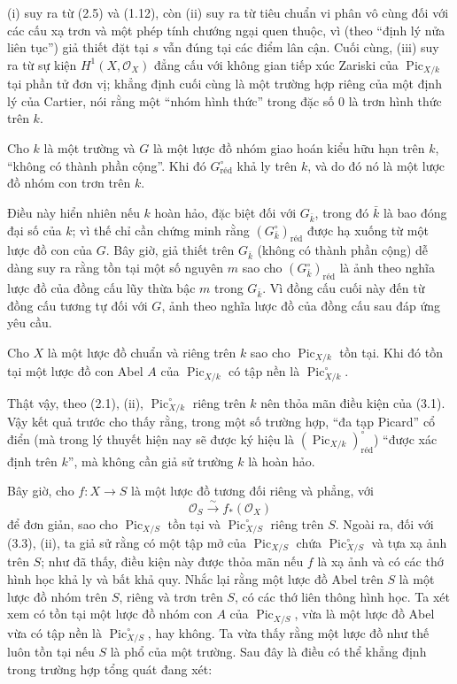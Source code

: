 (i) suy ra từ (2.5) và (1.12), còn (ii) suy ra từ tiêu chuẩn vi phân vô cùng
đối với các cấu xạ trơn và một phép tính chướng ngại quen thuộc, vì (theo
``định lý nửa liên tục'') giả thiết đặt tại $s$ vẫn đúng tại các điểm lân cận.
Cuối cùng, (iii) suy ra từ sự kiện $H^1(X,\mathcal O_X)$ đẳng cấu với không
gian tiếp xúc Zariski của $\operatorname{Pic}_{X/k}$ tại phần tử đơn vị; khẳng
định cuối cùng là một trường hợp riêng của một định lý của Cartier, nói rằng
một ``nhóm hình thức'' trong đặc số 0 là trơn hình thức trên $k$.


 Cho $k$ là một trường và $G$ là một lược đồ nhóm giao
hoán kiểu hữu hạn trên $k$, ``không có thành phần cộng''. Khi đó
$G_{\mathrm{réd}}^\circ$ khả ly trên $k$, và do đó nó là một lược đồ nhóm con
trơn trên $k$.

Điều này hiển nhiên nếu $k$ hoàn hảo, đặc biệt đối với $G_{\bar k}$, trong đó
$\bar k$ là bao đóng đại số của $k$; vì thế chỉ cần chứng minh rằng
$(G_{\bar k}^\circ)_{\mathrm{réd}}$ được hạ xuống từ một lược đồ con của $G$.
Bây giờ, giả thiết trên $G_{\bar k}$ (không có thành phần cộng) dễ dàng suy ra rằng tồn tại một số nguyên $m$ sao cho
$(G_{\bar k}^\circ)_{\mathrm{réd}}$ là ảnh theo nghĩa lược đồ của đồng cấu lũy
thừa bậc $m$ trong $G_{\bar k}$. Vì đồng cấu cuối này đến từ đồng cấu tương tự
đối với $G$, ảnh theo nghĩa lược đồ của đồng cấu sau đáp ứng yêu cầu.

 Cho $X$ là một lược đồ chuẩn và riêng trên $k$ sao cho
$\operatorname{Pic}_{X/k}$ tồn tại. Khi đó tồn tại một lược đồ con Abel $A$
của $\operatorname{Pic}_{X/k}$ có tập nền là
$\operatorname{Pic}_{X/k}^\circ$.

Thật vậy, theo (2.1), (ii), $\operatorname{Pic}_{X/k}^\circ$ riêng trên $k$
nên thỏa mãn điều kiện của (3.1).
Vậy kết quả trước cho thấy rằng, trong một số trường hợp, ``đa tạp Picard''
cổ điển (mà trong lý thuyết hiện nay sẽ được ký hiệu là
$(\operatorname{Pic}_{X/k})_{\mathrm{réd}}^\circ$) ``được xác định trên
$k$'', mà không cần giả sử trường $k$ là hoàn hảo.

Bây giờ, cho $f:X\longrightarrow S$ là một lược đồ tương đối riêng và phẳng,
với
\[
\mathcal O_S\xrightarrow{\sim}f_*(\mathcal O_X)
\]
để đơn giản, sao cho $\operatorname{Pic}_{X/S}$ tồn tại và
$\operatorname{Pic}_{X/S}^\circ$ riêng trên $S$. Ngoài ra, đối với (3.3),
(ii), ta giả sử rằng có một tập mở của $\operatorname{Pic}_{X/S}$ chứa
$\operatorname{Pic}_{X/S}^\circ$ và tựa xạ ảnh trên $S$; như đã thấy, điều
kiện này được thỏa mãn nếu $f$ là xạ ảnh và có các thớ hình học khả ly và bất khả
quy. Nhắc lại rằng một lược đồ Abel trên $S$ là một lược đồ nhóm trên $S$,
riêng và trơn trên $S$, có các thớ liên thông hình học. Ta xét xem có tồn tại
một lược đồ nhóm con $A$ của $\operatorname{Pic}_{X/S}$, vừa là một lược đồ
Abel vừa có tập nền là $\operatorname{Pic}_{X/S}^\circ$, hay không. Ta vừa
thấy rằng một lược đồ như thế luôn tồn tại nếu $S$ là phổ của một trường. Sau
đây là điều có thể khẳng định trong trường hợp tổng quát đang xét:

